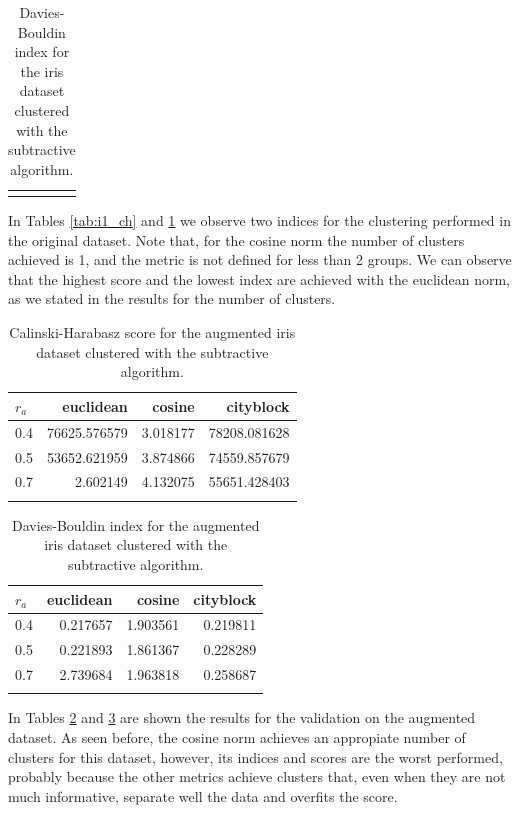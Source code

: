 \documentclass[conference]{IEEEtran}
\begin{document}
\begin{itemize}
\begin{table}[ht!]
\begin{tabular}{lrrr}
        \bottomrule \\
        \end{tabular}
        \caption{Davies-Bouldin index for the iris dataset clustered with the subtractive algorithm.}
        \label{tab:i1_db}
    \end{table}
    In Tables \ref{tab:i1_ch} and \ref{tab:i1_db} we observe two indices for the clustering performed in the original dataset. Note that, for the cosine norm the number of clusters achieved is 1, and the metric is not defined for less than 2 groups. We can observe that the highest score and the lowest index are achieved with the euclidean norm, as we stated in the results for the number of clusters.
    \begin{table}[ht!]
        \centering
        \begin{tabular}{lrrr}
        \toprule
        $r_a$ &     euclidean &    cosine &     cityblock \\
        \midrule
        0.4 &  76625.576579 &  3.018177 &  78208.081628 \\
        0.5 &  53652.621959 &  3.874866 &  74559.857679 \\
        0.7 &      2.602149 &  4.132075 &  55651.428403 \\
        \bottomrule \\
        \end{tabular}
        \caption{Calinski-Harabasz score for the augmented iris dataset clustered with the subtractive algorithm.}
        \label{tab:i2_cb}
    \end{table}
    \begin{table}[ht!]
        \centering
        \begin{tabular}{lrrr}
        \toprule
        $r_a$ &  euclidean &    cosine &  cityblock \\
        \midrule
        0.4 &   0.217657 &  1.903561 &   0.219811 \\
        0.5 &   0.221893 &  1.861367 &   0.228289 \\
        0.7 &   2.739684 &  1.963818 &   0.258687 \\
        \bottomrule \\
        \end{tabular}
        \caption{Davies-Bouldin index for the augmented iris dataset clustered with the subtractive algorithm.}
        \label{tab:i2_db}
    \end{table}
    In Tables \ref{tab:i2_cb} and \ref{tab:i2_db} are shown the results for the validation on the augmented dataset. As seen before, the cosine norm achieves an appropiate number of clusters for this dataset, however, its indices and scores are the worst performed, probably because the other metrics achieve clusters that, even when they are not much informative, separate well the data and overfits the score. \\ 

\end{itemize}
\end{document}
